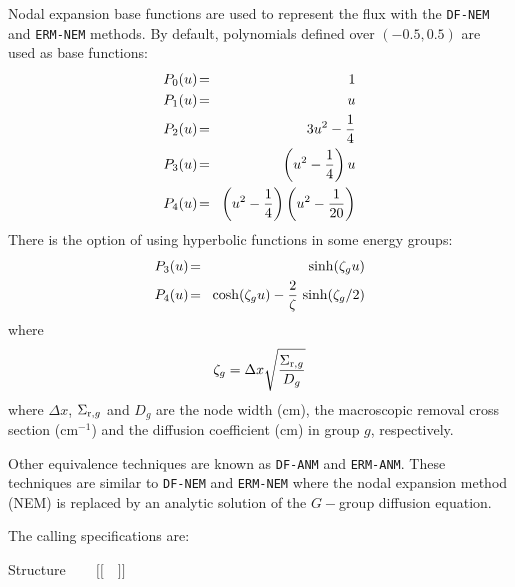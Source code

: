 \vskip 0.02cm

Nodal expansion base functions are used to represent the flux with the {\tt DF-NEM} and {\tt ERM-NEM}
methods. By default, polynomials defined over $(-0.5,0.5)$ are used as base functions:\cite{nestle}
\begin{eqnarray}
\nonumber P_0(u)\negthinspace &=&\negthinspace 1\\
\nonumber P_1(u)\negthinspace &=&\negthinspace u\\
\nonumber P_2(u)\negthinspace &=&\negthinspace 3u^2-{1\over 4}\\
\nonumber P_3(u)\negthinspace &=&\negthinspace \left( u^2-{1\over 4}\right)u\\
P_4(u)\negthinspace &=&\negthinspace \left( u^2-{1\over 4}\right)\left( u^2-{1\over 20}\right)
\end{eqnarray}
There is the option of using hyperbolic functions in some energy groups:
\begin{eqnarray}
\nonumber P_3(u)\negthinspace &=&\negthinspace \sinh(\zeta_g u)\\
P_4(u)\negthinspace &=&\negthinspace \cosh(\zeta_g u)-{2\over \zeta}\, \sinh(\zeta_g/2)
\end{eqnarray}
\noindent where
\begin{equation}
\zeta_g=\Delta x\sqrt{\Sigma_{{\rm r},g} \over D_g}
\end{equation}
\noindent where $\Delta x$, $\Sigma_{{\rm r},g}$ and $D_g$ are the node width (cm), the macroscopic removal cross section (cm$^{-1}$)
and the diffusion coefficient (cm) in group $g$, respectively.

\vskip 0.02cm

Other equivalence techniques are known as {\tt DF-ANM} and {\tt ERM-ANM}. These techniques are similar to {\tt DF-NEM} and
{\tt ERM-NEM} where the nodal expansion method (NEM) is replaced by an analytic solution of the $G-$group diffusion equation.

\goodbreak

The calling specifications are:

\begin{DataStructure}{Structure }
 ~\moc{:=}~~ $[[$~~$]]$ \moc{::}  \\
\end{DataStructure}

